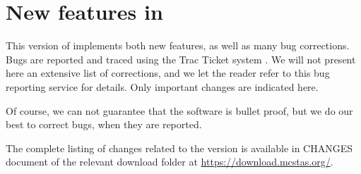
\chapter{New features in \MCS \version\ }
\label{c:changes}


This version of \MCS implements both new features, as well as many bug corrections. Bugs are reported and traced using the \MCS Trac Ticket system \cite{github_issue_webpage}. We will not present here an extensive list of corrections, and we let the reader refer to this bug reporting service for details. Only important changes are indicated here.

Of course, we can not guarantee that the software is bullet proof, but we do our best to correct bugs, when they are reported.

The complete listing of changes related to the version \MCS \version
is available in CHANGES document of the relevant download folder at
\url{https://download.mcstas.org/}.
